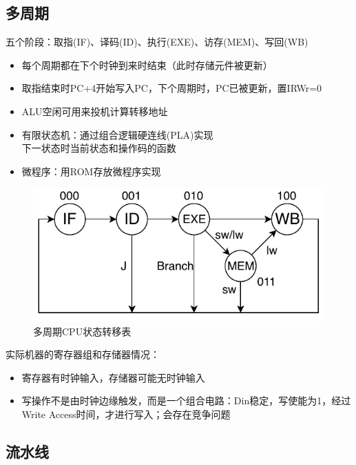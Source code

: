 \subsection{多周期}
五个阶段：取指(IF)、译码(ID)、执行(EXE)、访存(MEM)、写回(WB)\\
\begin{itemize}
	\item 每个周期都在下个时钟到来时结束（此时存储元件被更新）
	\item 取指结束时PC+4开始写入PC，下个周期时，PC已被更新，置IRWr=0
	\item ALU空闲可用来投机计算转移地址
\end{itemize}
\begin{itemize}
	\item 有限状态机：通过组合逻辑硬连线(PLA)实现\\
	下一状态时当前状态和操作码的函数
	\item 微程序：用ROM存放微程序实现
\end{itemize}
\begin{figure}[htbp]
\centering
\includegraphics[width=0.5\linewidth]{fig/Datapath-Multi-cycle.pdf}
\caption{多周期CPU状态转移表}
\end{figure}
实际机器的寄存器组和存储器情况：
\begin{itemize}
	\item 寄存器有时钟输入，存储器可能无时钟输入
	\item 写操作不是由时钟边缘触发，而是一个组合电路：Din稳定，写使能为1，经过Write Access时间，才进行写入；会存在竞争问题
\end{itemize}

\subsection{流水线}
